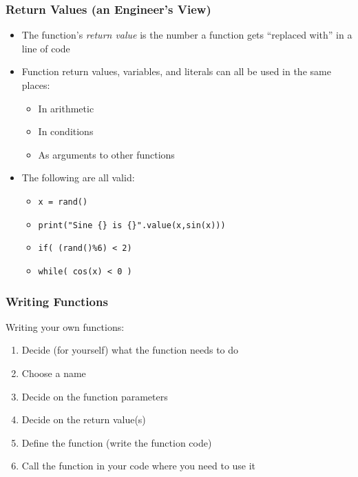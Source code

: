 \documentclass[english,14pt]{beamer}
\begin{document}
\begin{frame}
\frametitle{Return Values (an Engineer's View)}
\begin{itemize}
\item The function's \textit{return value} is the number a function gets ``replaced with'' in a line of code
\pause
\item Function return values, variables, and literals can all be used in the same places:
	\begin{itemize}
		\item In arithmetic
		\item In conditions
		\item As arguments to other functions
	\end{itemize}	 
\pause
\item The following are all valid:
	\begin{itemize}
		\item \texttt{x = rand()}
		\item \texttt{print("Sine \{\} is \{\}".value(x,sin(x)))}
		\item \texttt{if( (rand()\%6) < 2)}
		\item \texttt{while( cos(x) < 0 )}
	\end{itemize}
\end{itemize}
\end{frame}


\begin{frame}
\frametitle{Writing Functions}
Writing your own functions:
	\begin{enumerate}
		\item Decide (for yourself) what the function needs to do
		\pause
		\item Choose a name
		\pause
		\item Decide on the function parameters
		\pause
		\item Decide on the return value(s)
		\pause
		\item Define the function (write the function code)
		\item Call the function in your code where you need to use it	
	\end{enumerate}
\end{frame}
\end{document}
